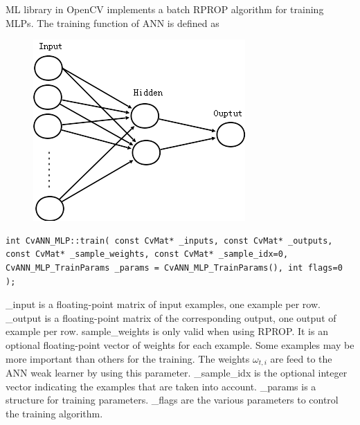 ML library in OpenCV implements a batch RPROP algorithm for training MLPs.  The training function of ANN is defined as
\begin{figure}
\begin{center}
  \includegraphics{ch4/figures/annstructure.png}
\end{center}
\caption{}
\label{fig:annstructure}
\end{figure}
\lstset{language=C++}
\lstset{basicstyle=\scriptsize\ttfamily,
showspaces=false,
showtabs=false,
columns=fixed,
frame=none,
numberstyle=\scriptsize,
breaklines=true,
showstringspaces=false,
xleftmargin=1cm
}
\begin{lstlisting}
int CvANN_MLP::train( const CvMat* _inputs, const CvMat* _outputs, const CvMat* _sample_weights, const CvMat* _sample_idx=0, CvANN_MLP_TrainParams _params = CvANN_MLP_TrainParams(), int flags=0 );
\end{lstlisting}

\_input is a floating-point matrix of input examples, one example per row. {\_output} is a floating-point matrix of the corresponding output, one output of example per row. 
 sample\_weights is only valid when using RPROP. It is an optional floating-point vector of weights for each example. Some examples may be more important than others for the training. The weights $ \omega_{t,i} $ are feed to the ANN weak learner by using this parameter. 
{\_sample\_idx} is the optional integer vector indicating the examples  that are taken into account. 
{\_params} is a structure for training parameters. 
{\_flags} are the various parameters to control the training algorithm.
